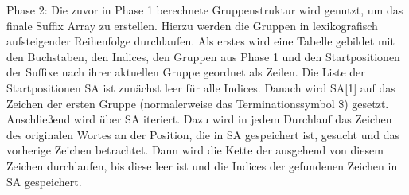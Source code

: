 Phase 2: Die zuvor in Phase 1 berechnete Gruppenstruktur wird genutzt, um das finale Suffix Array zu erstellen. 
Hierzu werden die Gruppen in lexikografisch aufsteigender Reihenfolge durchlaufen.
Als erstes wird eine Tabelle gebildet mit den Buchstaben, den Indices, den Gruppen aus Phase 1 und den Startpositionen der Suffixe nach ihrer aktuellen Gruppe geordnet als Zeilen. 
Die Liste der Startpositionen SA ist zunächst leer für alle Indices.
Danach wird SA[1] auf das Zeichen der ersten Gruppe (normalerweise das Terminationssymbol \$) gesetzt.
Anschließend wird über SA iteriert. 
Dazu wird in jedem Durchlauf das Zeichen des originalen Wortes an der Position, die in SA gespeichert ist, gesucht und das vorherige Zeichen betrachtet. 
Dann wird die Kette der \prevpointer ausgehend von diesem Zeichen durchlaufen, bis diese leer ist und die Indices der gefundenen Zeichen in SA gespeichert. 